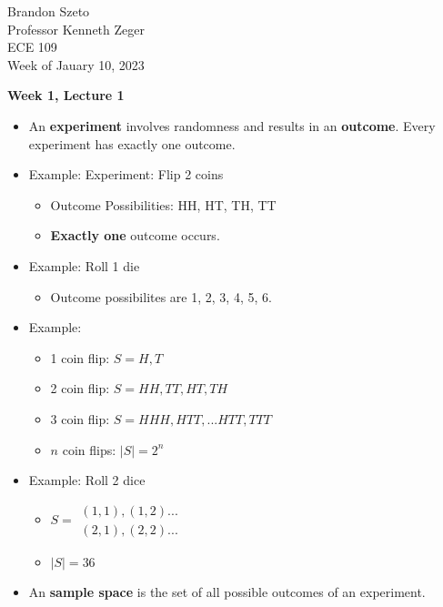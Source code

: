 \documentclass[10pt]{article}
\begin{document}
\begin{flushleft}
    Brandon Szeto \\
    Professor Kenneth Zeger \\
	ECE 109 \\
	Week of Jauary 10, 2023
\end{flushleft}

\begin{center}
	\Large \textbf{Week 1, Lecture 1}
\end{center}
\normalsize

\begin{itemize}
    \item 
An \textbf{experiment} involves randomness and results in an \textbf{outcome}. Every experiment has exactly one outcome.
    \item Example: Experiment: Flip 2 coins
        \begin{itemize}
            \item Outcome Possibilities: HH, HT, TH, TT
            \item \textbf{Exactly one} outcome occurs.
        \end{itemize}
    \item Example: Roll 1 die
        \begin{itemize}
            \item Outcome possibilites are 1, 2, 3, 4, 5, 6.
        \end{itemize}
    \item Example: 
        \begin{itemize}
            \item 1 coin flip: $S = {H, T}$
            \item 2 coin flip: $S = {HH, TT, HT, TH}$
            \item 3 coin flip: $S = {HHH, HTT, ... HTT, TTT}$
            \item $n$ coin flips: $|S| = 2^n$
        \end{itemize}
    \item Example: Roll 2 dice 
        \begin{itemize}
            \item $ S = 
    \begin{array}{lr}
        (1,1), (1,2) ...\\
        (2,1), (2,2) ... 
    \end{array}
    $
            \item $|S| = 36$
        \end{itemize}
    \item An \textbf{sample space} is the set of all possible outcomes of an experiment.

\end{itemize}
\end{document}
